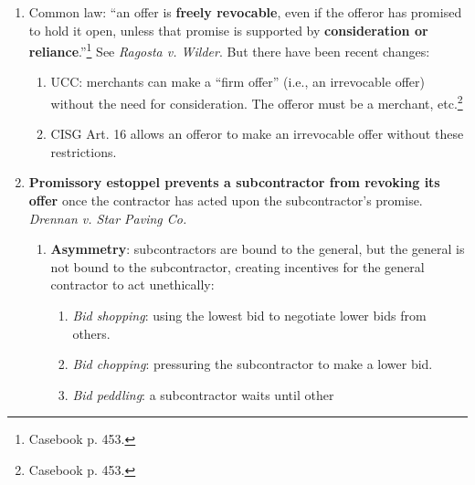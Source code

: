 \begin{enumerate}
\begin{enumerate}
\begin{enumerate}
{            446--47.}
            \item So, the Restatement (First) drew a distinction between 
            \textbf{performing} and \textbf{preparing to perform}, which the 
            court followed in \emph{Ragosta v. Wilder}. But the distinction 
            can be hard to justify. For instance, say the unilateral offer is 
            that I'll give you \$1,000 to cross the Brooklyn Bridge. If you 
            take one step on the bridge, there is a contract. But if you spend 
            hours preparing, there is no contract.
        \end{enumerate}
        \item Common law: ``an offer is \textbf{freely revocable}, even if the 
        offeror has promised to hold it open, unless that promise is supported 
        by \textbf{consideration or reliance}.''\footnote{Casebook p. 453.} 
        See \emph{Ragosta v. Wilder}. But there have been recent changes:
        \begin{enumerate}
            \item UCC: merchants can make a ``firm offer'' (i.e., an 
            irrevocable offer) without the need for consideration. The offeror 
            must be a merchant, etc.\footnote{Casebook p. 453.}
            \item CISG Art. 16 allows an offeror to make an irrevocable offer 
            without these restrictions.
        \end{enumerate}
        \item \textbf{Promissory estoppel prevents a subcontractor from 
        revoking its offer} once the contractor has acted upon the 
        subcontractor's promise.  \emph{Drennan v. Star Paving Co.}
        \begin{enumerate}
            \item \textbf{Asymmetry}: subcontractors are bound to the general, 
            but the general is not bound to the subcontractor, creating 
            incentives for the general contractor to act unethically:
            \begin{enumerate}
                \item \emph{Bid shopping}: using the lowest bid to negotiate 
                lower bids from others.
                \item \emph{Bid chopping}: pressuring the subcontractor to 
                make a lower bid.
                \item \emph{Bid peddling}: a subcontractor waits until other 

\end{enumerate}
\end{enumerate}
\end{enumerate}
\end{enumerate}
